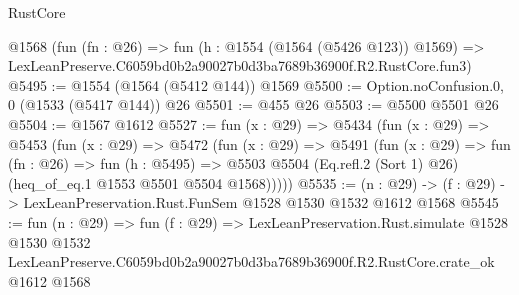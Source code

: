 \begin{lexlean}{RustCore}
\begin{coremodule}
    @1568
    (fun (fn : @26) =>
    fun (h : @1554 (@1564 (@5426 @123)) @1569) =>
    LexLeanPreserve.C6059bd0b2a90027b0d3ba7689b36900f.R2.RustCore.fun3)
@5495 := @1554 (@1564 (@5412 @144)) @1569
@5500 := Option.noConfusion.{0, 0} (@1533 (@5417 @144)) @26
@5501 := @455 @26
@5503 := @5500 @5501 @26
@5504 := @1567 @1612
@5527 := fun (x : @29) =>
  @5434
    (fun (x : @29) =>
    @5453
      (fun (x : @29) =>
      @5472
        (fun (x : @29) =>
        @5491
          (fun (x : @29) =>
          fun (fn : @26) =>
          fun (h : @5495) =>
          @5503 @5504 (Eq.refl.{2} (Sort 1) @26) (heq_of_eq.{1} @1553 @5501 @5504 @1568)))))
@5535 := (n : @29) -> (f : @29) -> LexLeanPreservation.Rust.FunSem @1528 @1530 @1532 @1612 @1568
@5545 := fun (n : @29) =>
  fun (f : @29) =>
  LexLeanPreservation.Rust.simulate
    @1528
    @1530
    @1532
    LexLeanPreserve.C6059bd0b2a90027b0d3ba7689b36900f.R2.RustCore.crate_ok
    @1612
    @1568
\end{coremodule}
\end{lexlean}
